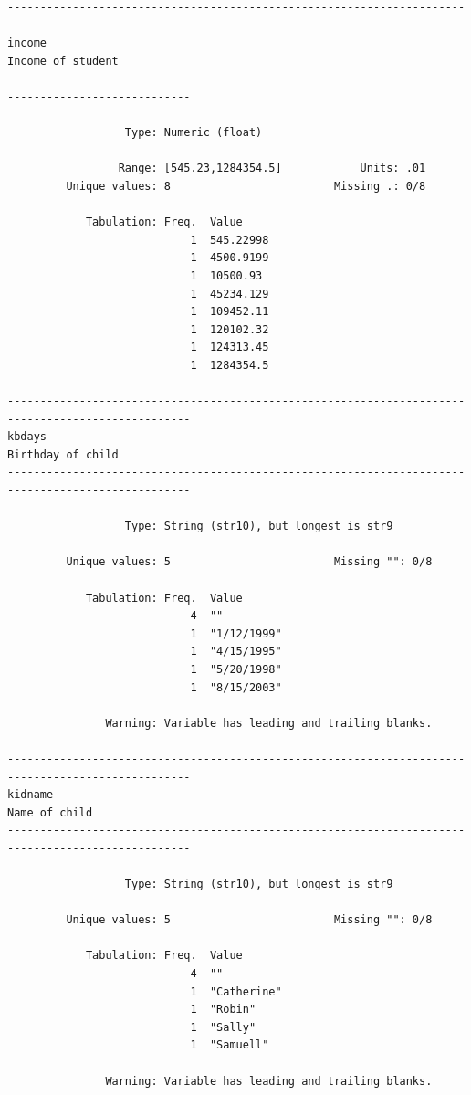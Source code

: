 \documentclass[
]{book}
\begin{document}
\begin{verbatim}
--------------------------------------------------------------------------------------------------
income                                                                           Income of student
--------------------------------------------------------------------------------------------------

                  Type: Numeric (float)

                 Range: [545.23,1284354.5]            Units: .01
         Unique values: 8                         Missing .: 0/8

            Tabulation: Freq.  Value
                            1  545.22998
                            1  4500.9199
                            1  10500.93
                            1  45234.129
                            1  109452.11
                            1  120102.32
                            1  124313.45
                            1  1284354.5

--------------------------------------------------------------------------------------------------
kbdays                                                                           Birthday of child
--------------------------------------------------------------------------------------------------

                  Type: String (str10), but longest is str9

         Unique values: 5                         Missing "": 0/8

            Tabulation: Freq.  Value
                            4  ""
                            1  "1/12/1999"
                            1  "4/15/1995"
                            1  "5/20/1998"
                            1  "8/15/2003"

               Warning: Variable has leading and trailing blanks.

--------------------------------------------------------------------------------------------------
kidname                                                                              Name of child
--------------------------------------------------------------------------------------------------

                  Type: String (str10), but longest is str9

         Unique values: 5                         Missing "": 0/8

            Tabulation: Freq.  Value
                            4  ""
                            1  "Catherine"
                            1  "Robin"
                            1  "Sally"
                            1  "Samuell"

               Warning: Variable has leading and trailing blanks.
\end{verbatim}
\end{document}
